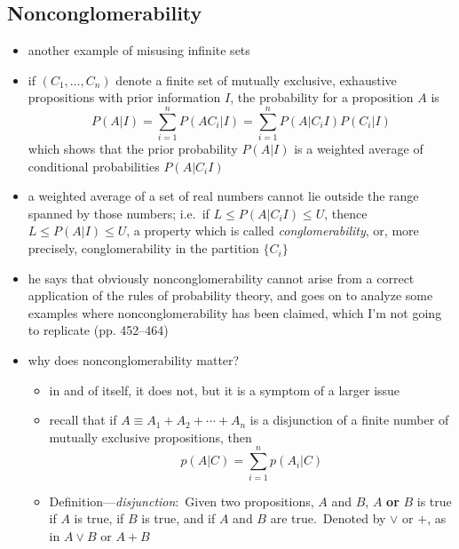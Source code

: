 \documentclass[../jaynes_prob_theory_notes.tex]{subfiles}
\begin{document}
        \subsection{Nonconglomerability}
            \begin{itemize} 
                \item another example of misusing infinite sets
                \item if \((C_1, \ldots, C_n)\) denote a finite set of mutually exclusive, exhaustive propositions with prior information \(I\), the probability for a proposition \(A\) is
                    \begin{equation*} 
                        P(A|I) = \sum\limits^{n}_{i=1} P(AC_i | I) = \sum\limits^{n}_{i=1} P(A|C_i I)P(C_i | I)
                    \end{equation*}
                    which shows that the prior probability \(P(A|I)\) is a weighted average of conditional probabilities \(P(A|C_i I)\)
                \item a weighted average of a set of real numbers cannot lie outside the range spanned by those numbers; i.e.\ if \(L \leq P(A| C_i I) \leq U\), thence \(L \leq P(A|I) \leq U\), a property which is called \textit{conglomerability}, or, more precisely, conglomerability in the partition \(\{C_i\}\)
                \item he says that obviously nonconglomerability cannot arise from a correct application of the rules of probability theory, and goes on to analyze some examples where nonconglomerability has been claimed, which I'm not going to replicate (pp. 452--464)
                \item why does nonconglomerability matter?
                    \begin{itemize} 
                        \item in and of itself, it does not, but it is a symptom of a larger issue
                        \item recall that if \(A \equiv A_1 + A_2 + \cdots + A_n\) is a disjunction of a finite number of mutually exclusive propositions, then
                            \begin{equation*} 
                                p(A|C) = \sum^{n}_{i=1} p(A_i | C)
                            \end{equation*}
                        \item Definition---\textit{disjunction}:\ Given two propositions, \(A\) and \(B\), \(A\) \textbf{or} \(B\) is true if \(A\) is true, if \(B\) is true, and if \(A\) and \(B\) are true.\ Denoted by \(\vee\) or \(+\), as in \(A \vee B\) or \(A + B\)

\end{itemize}
\end{itemize}
\end{document}
